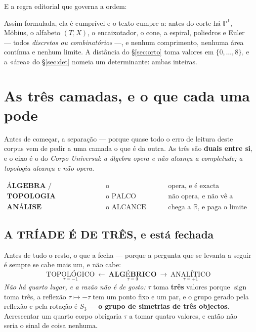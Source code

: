 \documentclass[11pt,a4paper]{article}
\begin{document}
\medskip
\noindent E a regra editorial que governa a ordem:
\begin{center}
\end{center}
Assim formulada, ela é cumprível e o texto cumpre-a: antes do corte há
$\mathbb{P}^1$, Möbius, o alfabeto $(T,X)$, o encaixotador, o cone, a espiral,
poliedros e Euler --- todos \emph{discretos ou combinatórios} ---, e nenhum
comprimento, nenhuma área contínua e nenhum limite. A distância do
\S\ref{sec:orto} toma valores em $\{0,\ldots,8\}$, e a «área» do
\S\ref{sec:det} nomeia um determinante: ambas inteiras.

\section{As três camadas, e o que cada uma pode}\label{sec:camadas}

Antes de começar, a separação --- porque quase todo o erro de leitura deste corpus vem de
pedir a uma camada o que é da outra. As três são \textbf{duais entre si}, e o eixo é o do
\emph{Corpo Universal}: \emph{a álgebra opera e não alcança a completude; a topologia
alcança e não opera}.

\[
\boxed{
\begin{array}{lll}
\textbf{ÁLGEBRA / ARITMÉTICA} & \text{o FUNDAMENTO} & \text{opera, e é exacta}\\[2pt]
\textbf{TOPOLOGIA} & \text{o PALCO} & \text{não opera, e não vê a medida}\\[2pt]
\textbf{ANÁLISE} & \text{o ALCANCE} & \text{chega a }\mathbb{R}\text{, e paga o limite}
\end{array}}
\]

\subsection*{A TRÍADE É DE TRÊS, e está fechada}

Antes de tudo o resto, o que a fecha --- porque a pergunta que se levanta a seguir é sempre
se cabe mais um, e não cabe:
\[
\boxed{\;\underset{\tau=-1}{\text{TOPOLÓGICO}}\ \longleftarrow\
\underset{\tau=0}{\textbf{ALGÉBRICO}}\ \longrightarrow\
\underset{\tau=+1}{\text{ANALÍTICO}}\;}
\]
\emph{Não há quarto lugar, e a razão não é de gosto:} $\tau$ toma \textbf{três} valores
porque $\operatorname{sign}$ toma três, a reflexão $\tau\mapsto-\tau$ tem um ponto fixo e um
par, e o grupo gerado pela reflexão e pela rotação é $S_3$ --- \textbf{o grupo de simetrias
de três objectos}. Acrescentar um quarto corpo obrigaria $\tau$ a tomar quatro valores, e
então não seria o sinal de coisa nenhuma.
\end{document}
